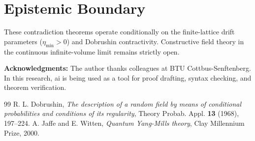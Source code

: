 \documentclass[11pt,a4paper]{article}
\theoremstyle{definition}
\begin{document}
\section{Epistemic Boundary}

These contradiction theorems operate conditionally on the finite-lattice drift parameters ($\eta_{\min} > 0$) and Dobrushin contractivity. Constructive field theory in the continuous infinite-volume limit remains strictly open.

\vspace{1em}
\noindent\textbf{Acknowledgments:} The author thanks colleagues at BTU Cottbus-Senftenberg. In this research, ai is being used as a tool for proof drafting, syntax checking, and theorem verification.

\begin{thebibliography}{99}
 R. L. Dobrushin, \emph{The description of a random field by means of conditional probabilities and conditions of its regularity}, Theory Probab. Appl. \textbf{13} (1968), 197--224.
 A. Jaffe and E. Witten, \emph{Quantum Yang-Mills theory}, Clay Millennium Prize, 2000.
\end{thebibliography}
\end{document}
